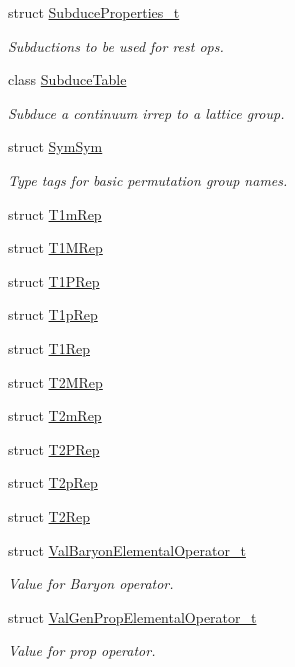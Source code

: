 \begin{DoxyCompactItemize}
struct \mbox{\hyperlink{structHadron_1_1SubduceProperties__t}{Subduce\+Properties\+\_\+t}}
\begin{DoxyCompactList}\small\item\em Subductions to be used for rest ops. \end{DoxyCompactList}\item 
class \mbox{\hyperlink{classHadron_1_1SubduceTable}{Subduce\+Table}}
\begin{DoxyCompactList}\small\item\em Subduce a continuum irrep to a lattice group. \end{DoxyCompactList}\item 
struct \mbox{\hyperlink{structHadron_1_1SymSym}{Sym\+Sym}}
\begin{DoxyCompactList}\small\item\em Type tags for basic permutation group names. \end{DoxyCompactList}\item 
struct \mbox{\hyperlink{structHadron_1_1T1mRep}{T1m\+Rep}}
\item 
struct \mbox{\hyperlink{structHadron_1_1T1MRep}{T1\+M\+Rep}}
\item 
struct \mbox{\hyperlink{structHadron_1_1T1PRep}{T1\+P\+Rep}}
\item 
struct \mbox{\hyperlink{structHadron_1_1T1pRep}{T1p\+Rep}}
\item 
struct \mbox{\hyperlink{structHadron_1_1T1Rep}{T1\+Rep}}
\item 
struct \mbox{\hyperlink{structHadron_1_1T2MRep}{T2\+M\+Rep}}
\item 
struct \mbox{\hyperlink{structHadron_1_1T2mRep}{T2m\+Rep}}
\item 
struct \mbox{\hyperlink{structHadron_1_1T2PRep}{T2\+P\+Rep}}
\item 
struct \mbox{\hyperlink{structHadron_1_1T2pRep}{T2p\+Rep}}
\item 
struct \mbox{\hyperlink{structHadron_1_1T2Rep}{T2\+Rep}}
\item 
struct \mbox{\hyperlink{structHadron_1_1ValBaryonElementalOperator__t}{Val\+Baryon\+Elemental\+Operator\+\_\+t}}
\begin{DoxyCompactList}\small\item\em Value for Baryon operator. \end{DoxyCompactList}\item 
struct \mbox{\hyperlink{structHadron_1_1ValGenPropElementalOperator__t}{Val\+Gen\+Prop\+Elemental\+Operator\+\_\+t}}
\begin{DoxyCompactList}\small\item\em Value for prop operator. \end{DoxyCompactList}\item 

\end{DoxyCompactItemize}

